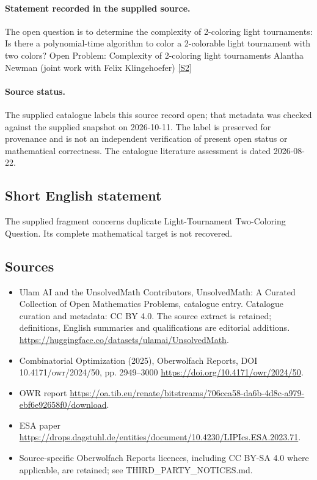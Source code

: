 \documentclass[11pt]{article}
\newcommand{\sref}[2]{\hyperlink{source:#1:#2}{[S#2]}}
\begin{document}
\paragraph{Statement recorded in the supplied source.}
The open question is to determine the complexity of 2-coloring light tournaments: Is there a polynomial-time algorithm to color a 2-colorable light tournament with two colors? Open Problem: Complexity of 2-coloring light tournaments Alantha Newman (joint work with Felix Klingehoefer) \sref{statement}{2}
\paragraph{Source status.}
The supplied catalogue labels this source record open; that metadata was checked against the supplied snapshot on 2026-10-11. The label is preserved for provenance and is not an independent verification of present open status or mathematical correctness. The catalogue literature assessment is dated 2026-08-22.
\subsection{Short English statement}
The supplied fragment concerns duplicate Light-Tournament Two-Coloring Question. Its complete mathematical target is not recovered.
\subsection{Sources}
\begin{itemize}
\item[\hypertarget{source:statement:1}{S1}] Ulam AI and the UnsolvedMath Contributors, UnsolvedMath: A Curated Collection of Open Mathematics Problems, catalogue entry. Catalogue curation and metadata: CC BY 4.0. The source extract is retained; definitions, English summaries and qualifications are editorial additions.
\url{https://huggingface.co/datasets/ulamai/UnsolvedMath}.
\item[\hypertarget{source:statement:2}{S2}] Combinatorial Optimization (2025), Oberwolfach Reports, DOI 10.4171/owr/2024/50, pp. 2949--3000
\url{https://doi.org/10.4171/owr/2024/50}.
\item[\hypertarget{source:statement:3}{S3}] OWR report
\url{https://oa.tib.eu/renate/bitstreams/706cca58-da6b-4d8c-a979-ebf6e92658f0/download}.
\item[\hypertarget{source:statement:4}{S4}] ESA paper
\url{https://drops.dagstuhl.de/entities/document/10.4230/LIPIcs.ESA.2023.71}.
\item Source-specific Oberwolfach Reports licences, including CC BY-SA 4.0 where applicable, are retained; see THIRD\_PARTY\_NOTICES.md.
\end{itemize}
\end{document}
